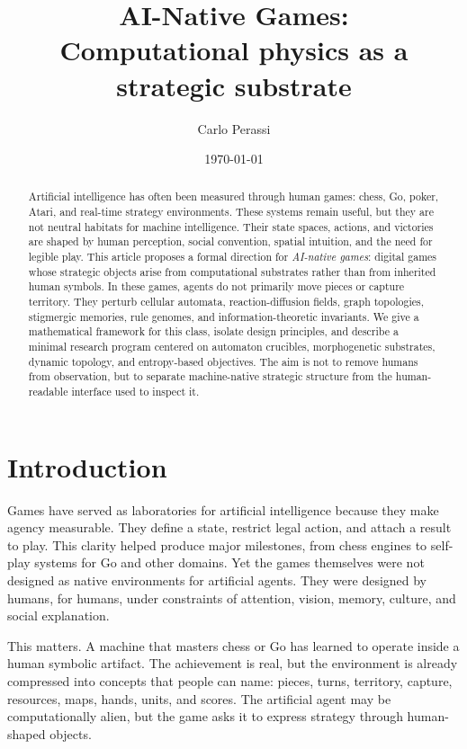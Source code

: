 \documentclass[11pt,a4paper]{article}
\title{AI-Native Games:\\Computational physics as a strategic substrate}
\author{Carlo Perassi}
\date{\today}
\theoremstyle{plain}
\theoremstyle{definition}
\begin{document}
\maketitle

\begin{abstract}
Artificial intelligence has often been measured through human games: chess, Go, poker, Atari, and real-time strategy environments. These systems remain useful, but they are not neutral habitats for machine intelligence. Their state spaces, actions, and victories are shaped by human perception, social convention, spatial intuition, and the need for legible play. This article proposes a formal direction for \emph{AI-native games}: digital games whose strategic objects arise from computational substrates rather than from inherited human symbols. In these games, agents do not primarily move pieces or capture territory. They perturb cellular automata, reaction-diffusion fields, graph topologies, stigmergic memories, rule genomes, and information-theoretic invariants. We give a mathematical framework for this class, isolate design principles, and describe a minimal research program centered on automaton crucibles, morphogenetic substrates, dynamic topology, and entropy-based objectives. The aim is not to remove humans from observation, but to separate machine-native strategic structure from the human-readable interface used to inspect it.
\end{abstract}

\section{Introduction}\label{sec:introduction}

Games have served as laboratories for artificial intelligence because they make agency measurable. They define a state, restrict legal action, and attach a result to play. This clarity helped produce major milestones, from chess engines to self-play systems for Go and other domains. Yet the games themselves were not designed as native environments for artificial agents. They were designed by humans, for humans, under constraints of attention, vision, memory, culture, and social explanation.

This matters. A machine that masters chess or Go has learned to operate inside a human symbolic artifact. The achievement is real, but the environment is already compressed into concepts that people can name: pieces, turns, territory, capture, resources, maps, hands, units, and scores. The artificial agent may be computationally alien, but the game asks it to express strategy through human-shaped objects.
\end{document}
